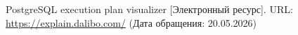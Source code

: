 \begin{thebibliography}{}
     PostgreSQL execution plan visualizer
     [Электронный ресурс]. URL: \href{https://explain.dalibo.com/}{https://explain.dalibo.com/} (Дата обращения: 20.05.2026)



\end{thebibliography}
\newpage